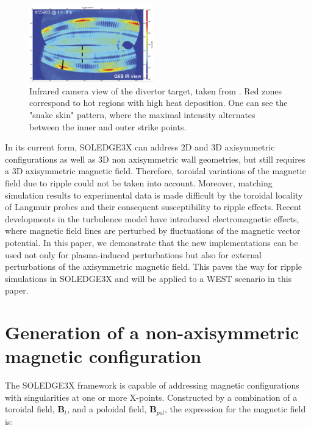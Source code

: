 \begin{figure}[H]\centering
	\centering
	\includegraphics[width=0.48\textwidth]{schemes/IR_WEST_ripple.jpg}
	\caption[Infrared camera view of the divertor target, taken from \cite{bucalossi2022}]{Infrared camera view of the divertor target, taken from \cite{bucalossi2022}. Red zones correspond to hot regions with high heat deposition. One can see the "snake skin" pattern, where the maximal intensity alternates between the inner and outer strike points.}
	\label{fig:IR_WEST}
\end{figure}

In its current form, SOLEDGE3X can address 2D and 3D axisymmetric configurations as well as 3D non axisymmetric wall geometries\cite{diGenova2023thesis}, but still requires a 3D axisymmetric magnetic field. Therefore, toroidal variations of the magnetic field due to ripple could not be taken into account. Moreover, matching simulation results to experimental data is made difficult by the toroidal locality of Langmuir probes and their consequent susceptibility to ripple effects. Recent developments in the turbulence model have introduced electromagnetic effects\cite{dull2024introducing}, where magnetic field lines are perturbed by fluctuations of the magnetic vector potential. In this paper, we demonstrate that the new implementations can be used not only for plasma-induced perturbations but also for external perturbations of the axisymmetric magnetic field. This paves the way for ripple simulations in SOLEDGE3X and will be applied to a WEST scenario in this paper. 

\section{Generation of a non-axisymmetric magnetic configuration}
\label{sec:rippleCalculation}

The SOLEDGE3X framework is capable of addressing magnetic configurations with singularities at one or more X-points. Constructed by a combination of a toroidal field, $\textbf{B}_t$, and a poloidal field, $\textbf{B}_{pol}$, the expression for the magnetic field is:

